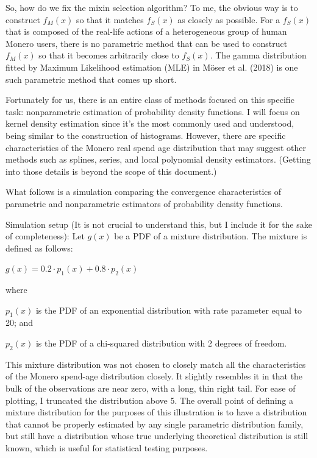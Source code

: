 \documentclass[english]{paper}
\begin{document}
So, how do we fix the mixin selection algorithm? To me, the obvious
way is to construct $f_{M}(x)$ so that it matches $f_{S}(x)$ as
closely as possible. For a $f_{S}(x)$ that is composed of the real-life
actions of a heterogeneous group of human Monero users, there is no
parametric method that can be used to construct $f_{M}(x)$ so that
it becomes arbitrarily close to $f_{S}(x)$. The gamma distribution
fitted by Maximum Likelihood estimation (MLE) in M{\"o}ser et al. (2018)
is one such parametric method that comes up short.

Fortunately for us, there is an entire class of methods focused on
this specific task: nonparametric estimation of probability density
functions. I will focus on kernel density estimation since it's the
most commonly used and understood, being similar to the construction
of histograms. However, there are specific characteristics of the
Monero real spend age distribution that may suggest other methods
such as splines, series, and local polynomial density estimators.
(Getting into those details is beyond the scope of this document.)

What follows is a simulation comparing the convergence characteristics
of parametric and nonparametric estimators of probability density
functions.

Simulation setup (It is not crucial to understand this, but I include
it for the sake of completeness): Let $g(x)$ be a PDF of a mixture
distribution. The mixture is defined as follows:

$g(x)=0.2\cdot p_{1}(x)+0.8\cdot p_{2}(x)$

where

$p_{1}(x)$ is the PDF of an exponential distribution with rate parameter
equal to 20; and

$p_{2}(x)$ is the PDF of a chi-squared distribution with 2 degrees
of freedom.

This mixture distribution was not chosen to closely match all the
characteristics of the Monero spend-age distribution closely. It slightly
resembles it in that the bulk of the observations are near zero, with
a long, thin right tail. For ease of plotting, I truncated the distribution
above 5. The overall point of defining a mixture distribution for
the purposes of this illustration is to have a distribution that cannot
be properly estimated by any single parametric distribution family,
but still have a distribution whose true underlying theoretical distribution
is still known, which is useful for statistical testing purposes.
\end{document}
